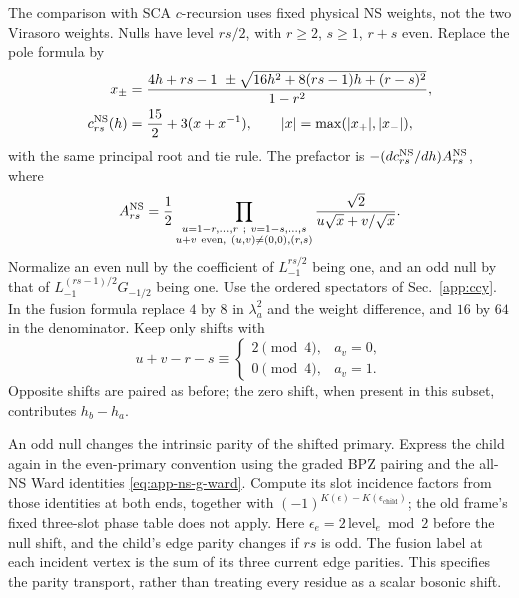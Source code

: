The comparison with SCA $c$-recursion uses fixed physical NS weights,
not the two Virasoro weights. Nulls have level $rs/2$, with
$r\ge2$, $s\ge1$, $r+s$ even. Replace the pole formula by
\begin{align}
 x_\pm&=\frac{4h+rs-1\ \pm
 \sqrt{16h^2+8(rs-1)h+(r-s)^2}}{1-r^2},\nonumber\\
 c_{rs}^{\mathrm{NS}}(h)&=\frac{15}{2}+3(x+x^{-1}),
 \qquad |x|=\max(|x_+|,|x_-|),
 \label{eq:app-ns-pole}
\end{align}
with the same principal root and tie rule. The prefactor is
$-(dc_{rs}^{\mathrm{NS}}/dh)A_{rs}^{\mathrm{NS}}$, where
\begin{equation}
 A_{rs}^{\mathrm{NS}}=\frac12
 \prod_{\substack{u=1-r,\ldots,r\ ;\ v=1-s,\ldots,s\\
  u+v\ \mathrm{even},\ (u,v)\ne(0,0),(r,s)}}
 \frac{\sqrt2}{u\sqrt x+v/\sqrt x}.
 \label{eq:app-ns-prefactor}
\end{equation}
Normalize an even null by the coefficient of $L_{-1}^{rs/2}$ being
one, and an odd null by that of $L_{-1}^{(rs-1)/2}G_{-1/2}$ being one.
Use the ordered spectators of Sec.~\ref{app:ccy}. In the fusion formula
replace $4$ by $8$ in $\lambda_a^2$ and the weight difference, and
$16$ by $64$ in the denominator. Keep only shifts with
\begin{equation}
 u+v-r-s\equiv
 \begin{cases}2\pmod4,&a_v=0,\\0\pmod4,&a_v=1.
 \end{cases}
 \label{eq:app-ns-fusion-selection}
\end{equation}
Opposite shifts are paired as before; the zero shift, when present in
this subset, contributes $h_b-h_a$.

An odd null changes the intrinsic parity of the shifted primary.
Express the child again in the even-primary convention using the
graded BPZ pairing and the all-NS Ward identities
\eqref{eq:app-ns-g-ward}. Compute its slot incidence factors from
those identities at both ends, together with
$(-1)^{K(\epsilon)-K(\epsilon_{\mathrm{child}})}$;
the old frame's fixed three-slot phase table does not apply.
Here $\epsilon_e=2\,\mathrm{level}_e\bmod2$ before the null shift,
and the child's edge parity changes if $rs$ is odd. The fusion label
at each incident vertex is the sum of its three current edge parities.
This specifies the parity transport, rather than treating every
residue as a scalar bosonic shift.


